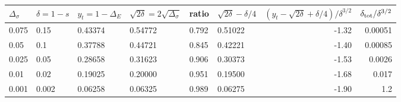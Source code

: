 \begin{tabular}{@{}llllllrr@{}}
\toprule
$\Delta_\sigma$ & $\delta=1-s$ & $y_t=1-\Delta_E$ & $\sqrt{2\delta}=2\sqrt{\Delta_\sigma}$ & ratio & $\sqrt{2\delta}-\delta/4$ & $(y_t-\sqrt{2\delta}+\delta/4)/\delta^{3/2}$ & $\delta_{\rm tot}/\delta^{3/2}$\\
\midrule
0.075 & 0.15 & 0.43374 & 0.54772 & 0.792 & 0.51022 & -1.32 & 0.00051\\
0.05 & 0.1 & 0.37788 & 0.44721 & 0.845 & 0.42221 & -1.40 & 0.00085\\
0.025 & 0.05 & 0.28658 & 0.31623 & 0.906 & 0.30373 & -1.53 & 0.0026\\
0.01 & 0.02 & 0.19025 & 0.20000 & 0.951 & 0.19500 & -1.68 & 0.017\\
0.001 & 0.002 & 0.06258 & 0.06325 & 0.989 & 0.06275 & -1.90 & 1.2\\
\bottomrule
\end{tabular}
